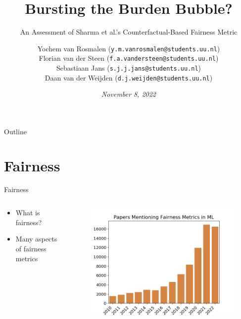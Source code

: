 \documentclass[aspectratio=169]{beamer}
\title{Bursting the Burden Bubble?}
\subtitle{An Assessment of Sharma et al.'s Counterfactual-Based Fairness Metric}
\date{\textit{November 8, 2022}}
\author{%
Yochem van Rosmalen {\scriptsize(\texttt{y.m.vanrosmalen@students.uu.nl})}\\
Florian van der Steen {\scriptsize(\texttt{f.a.vandersteen@students.uu.nl})}\\
Sebastiaan Jans {\scriptsize(\texttt{s.j.j.jans@students.uu.nl})}\\
Daan van der Weijden {\scriptsize(\texttt{d.j.weijden@students.uu.nl})}
}
\institute{Utrecht University, The Netherlands}
\begin{document}
\maketitle

\begin{frame}{Outline}
    \tableofcontents
\end{frame}

\section{Fairness}

\begin{frame}{Fairness}
    \begin{columns}
        \begin{column}{0.5\textwidth}
            \begin{itemize}
            \item What is fairness?
            \item Many aspects of fairness \pause \alert{metrics}
            \end{itemize}
        \end{column}
        \begin{column}{0.5\textwidth}
            \begin{figure}
                \centering
                \includegraphics[width=\textwidth]{img/fairness.png}
                \label{fig:fairnessmetrics}
            \end{figure}
        \end{column}
    \end{columns}
\end{frame}
\end{document}
